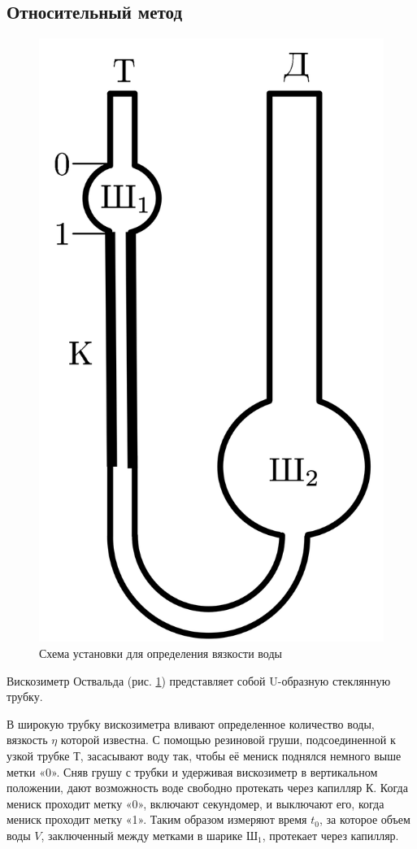 \documentclass[a4paper,12pt]{article} %
\begin{document}
\FloatBarrier

\subsection*{Относительный метод}

\begin{figure}[h!]
    \centering
    \includegraphics[height=0.32\textwidth]{установка2}
    \caption{Схема установки для определения вязкости воды}
	\label{setup2}
\end{figure}

Вискозиметр Оствальда (рис. \ref{setup2}) представляет собой U-образную стеклянную трубку.

В широкую трубку вискозиметра вливают определенное количество воды, вязкость \( \eta \) которой известна. С помощью резиновой груши, подсоединенной к узкой трубке \(Т\), засасывают воду так, чтобы её мениск поднялся немного выше метки «0». Сняв грушу с трубки и удерживая вискозиметр в вертикальном положении, дают возможность воде свободно протекать через капилляр \(К\). Когда мениск проходит метку «0», включают секундомер, и выключают его, когда мениск проходит метку «1». Таким образом измеряют время \( t_0 \), за которое объем воды \( V \), заключенный между метками в шарике \(Ш_1\), протекает через капилляр.


\FloatBarrier



\end{document}
